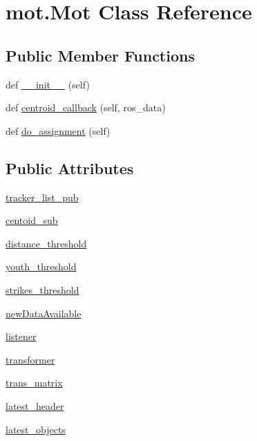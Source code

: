 \hypertarget{classmot_1_1Mot}{}\section{mot.\+Mot Class Reference}
\label{classmot_1_1Mot}
\subsection*{Public Member Functions}
\begin{DoxyCompactItemize}
\item 
def \hyperlink{classmot_1_1Mot_a63d1ea755e2c380d5d8830862874b56a}{\+\_\+\+\_\+init\+\_\+\+\_\+} (self)
\item 
def \hyperlink{classmot_1_1Mot_a2f570a81beec7c5a9aedb86f586e4278}{centroid\+\_\+callback} (self, ros\+\_\+data)
\item 
def \hyperlink{classmot_1_1Mot_a146dfd7ffe29a4099dccc3cc1051e631}{do\+\_\+assignment} (self)
\end{DoxyCompactItemize}
\subsection*{Public Attributes}
\begin{DoxyCompactItemize}
\item 
\hyperlink{classmot_1_1Mot_a618159389311b0b4fab2ef8b478ea2df}{tracker\+\_\+list\+\_\+pub}
\item 
\hyperlink{classmot_1_1Mot_a806b7698802e61046a4fce8890f5c52b}{centoid\+\_\+sub}
\item 
\hyperlink{classmot_1_1Mot_a9b710d92b9f34ffeea025df93cb2bb80}{distance\+\_\+threshold}
\item 
\hyperlink{classmot_1_1Mot_ac9045d15685595e5c9c0d73a07096fd5}{youth\+\_\+threshold}
\item 
\hyperlink{classmot_1_1Mot_a4f4718be93ace6f22b7e505e50ba4422}{strikes\+\_\+threshold}
\item 
\hyperlink{classmot_1_1Mot_a09b9273b0c9ac16aca96e09a9a8286ee}{new\+Data\+Available}
\item 
\hyperlink{classmot_1_1Mot_a5d3db20cb3944a6b4206b2c2cabb8c25}{listener}
\item 
\hyperlink{classmot_1_1Mot_ac1213e59910aae6fed426abb8debee7e}{transformer}
\item 
\hyperlink{classmot_1_1Mot_a5224b869eed96f5fb233eb19b7a5dee2}{trans\+\_\+matrix}
\item 
\hyperlink{classmot_1_1Mot_a0454aadfd7e1cfba0ac43bbd57052758}{latest\+\_\+header}
\item 
\hyperlink{classmot_1_1Mot_a7a40f92ea70acf4200484294185a8759}{latest\+\_\+objects}
\end{DoxyCompactItemize}
